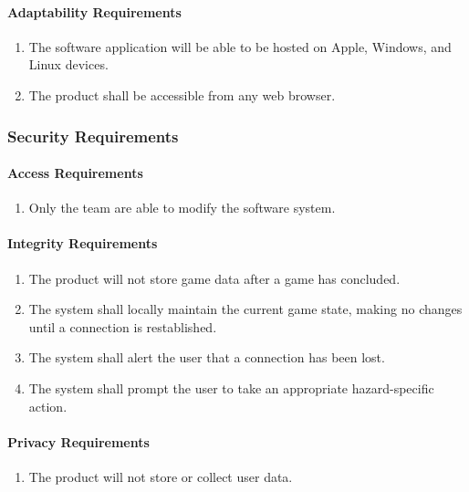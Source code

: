 \documentclass[12pt]{article}
\begin{document}
{\paragraph{Adaptability Requirements}
\begin{enumerate}[{MS}1., leftmargin=2\parindent, resume]
    \item The software application will be able to be hosted on Apple, Windows, and Linux devices.
    \item The product shall be accessible from any web browser.
\end{enumerate}



\subsubsection{Security Requirements}
\label{NFR_SR}
\paragraph{Access Requirements}
\begin{enumerate}[{SR}1., leftmargin=2\parindent]
    \item Only the \progname{} team are able to modify the software system.
\end{enumerate}

\paragraph{Integrity Requirements}
\begin{enumerate}[{SR}1., leftmargin=2\parindent, resume]
    \item The product will not store game data after a game has concluded.
    \item The system shall locally maintain the current game state, making no changes until a connection is restablished.
    \item The system shall alert the user that a connection has been lost.
    \item The system shall prompt the user to take an appropriate hazard-specific action.
\end{enumerate}

\paragraph{Privacy Requirements}
\begin{enumerate}[{SR}1., leftmargin=2\parindent, resume]
    \item The product will not store or collect user data.
\end{enumerate}

}
\end{document}

